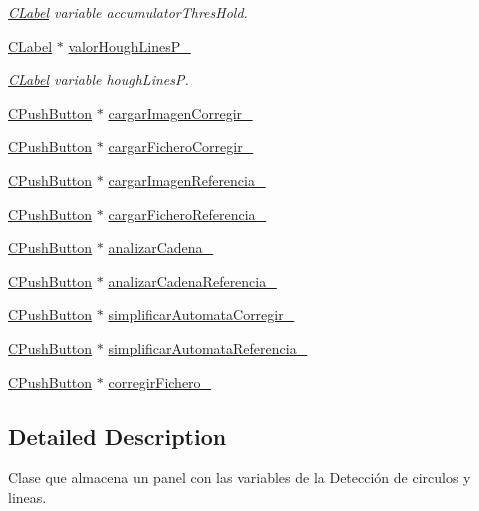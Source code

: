 \begin{DoxyCompactItemize}
\begin{DoxyCompactList}\small\item\em \hyperlink{classCLabel}{C\+Label} variable accumulator\+Thres\+Hold. \end{DoxyCompactList}\item 
\hyperlink{classCLabel}{C\+Label} $\ast$ \hyperlink{classCPanelOpciones_ab415dcfa099eb5bc1fe6e576fe50e4ca}{valor\+Hough\+Lines\+P\+\_\+}
\begin{DoxyCompactList}\small\item\em \hyperlink{classCLabel}{C\+Label} variable hough\+LinesP. \end{DoxyCompactList}\item 
\hyperlink{classCPushButton}{C\+Push\+Button} $\ast$ \hyperlink{classCPanelOpciones_ae86c6c794f6e7b6c207e9c445e41be01}{cargar\+Imagen\+Corregir\+\_\+}
\item 
\hyperlink{classCPushButton}{C\+Push\+Button} $\ast$ \hyperlink{classCPanelOpciones_aa559bc77eea6f021caa5f0c21ef82547}{cargar\+Fichero\+Corregir\+\_\+}
\item 
\hyperlink{classCPushButton}{C\+Push\+Button} $\ast$ \hyperlink{classCPanelOpciones_a74e3bdc7892ba6882651f31c1aea45ce}{cargar\+Imagen\+Referencia\+\_\+}
\item 
\hyperlink{classCPushButton}{C\+Push\+Button} $\ast$ \hyperlink{classCPanelOpciones_a50cc3593d49becea672e1e11c6f9c0df}{cargar\+Fichero\+Referencia\+\_\+}
\item 
\hyperlink{classCPushButton}{C\+Push\+Button} $\ast$ \hyperlink{classCPanelOpciones_ac8aee5d56aa7873f4a2df2700d57769f}{analizar\+Cadena\+\_\+}
\item 
\hyperlink{classCPushButton}{C\+Push\+Button} $\ast$ \hyperlink{classCPanelOpciones_aeb02ff08b9db9f47d5b1efa6a7782518}{analizar\+Cadena\+Referencia\+\_\+}
\item 
\hyperlink{classCPushButton}{C\+Push\+Button} $\ast$ \hyperlink{classCPanelOpciones_a2d4f07ede23ca44a3d1a2e00b6c0bad9}{simplificar\+Automata\+Corregir\+\_\+}
\item 
\hyperlink{classCPushButton}{C\+Push\+Button} $\ast$ \hyperlink{classCPanelOpciones_a87ad10795c4486442c3957088fcda067}{simplificar\+Automata\+Referencia\+\_\+}
\item 
\hyperlink{classCPushButton}{C\+Push\+Button} $\ast$ \hyperlink{classCPanelOpciones_ab80a05d83108d54639a2c053467791bf}{corregir\+Fichero\+\_\+}
\end{DoxyCompactItemize}


\subsection{Detailed Description}
Clase que almacena un panel con las variables de la Detección de circulos y lineas. 

